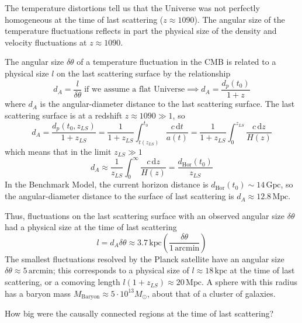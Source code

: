 \par The temperature distortions tell us that the Universe was not perfectly homogeneous at the time of last scattering ($z\approx1090$). The angular size of the temperature fluctuations reflects in part the physical size of the density and velocity fluctuations at $z \approx 1090$.
\par The angular size $\delta\theta$ of a temperature fluctuation in the CMB is related to a physical size $l$ on the last scattering surface by the relationship
\begin{equation*}
    d_{A} = \frac{l}{\delta\theta} \; \text{if we assume a flat Universe} \implies d_{A}=\frac{d_{p}(t_{0})}{1+z}
\end{equation*}
where $d_{A}$ is the angular-diameter distance to the last scattering surface. The last scattering surface is at a redshift $z\approx1090 \gg 1$, so
\begin{equation*}
    d_{A} = \frac{d_{p}(t_{0}, z_{LS})}{1+z_{LS}} = \frac{1}{1+z_{LS}}\int_{t(z_{LS})}^{t_{0}}\frac{c\,\text{d}t}{a(t)} = \frac{1}{1+z_{LS}}\int_{0}^{z_{LS}}\frac{c\,\text{d}z}{H(z)}
\end{equation*}
which means that in the limit $z_{LS}\gg 1$
\begin{equation*}
    d_{A} \approx \frac{1}{z_{LS}}\int_{0}^{\infty}\frac{c\,\text{d}z}{H(z)} = \frac{d_{\text{Hor}}(t_{0})}{z_{LS}}
\end{equation*}
In the Benchmark Model, the current horizon distance is $d_{\text{Hor}}(t_{0}) \sim 14\,\text{Gpc}$, so the angular-diameter distance to the surface of last scattering is $d_{A} \approx 12.8\,\text{Mpc}$.
\par Thus, fluctuations on the last scattering surface with an observed angular size $\delta\theta$ had a physical size at the time of last scattering
\begin{equation*}
    l = d_{A}\delta\theta \approx 3.7\,\text{kpc}\left(\frac{\delta\theta}{1\,\text{arcmin}}\right)
\end{equation*}
The smallest fluctuations resolved by the Planck satellite have an angular size $\delta\theta \approx 5\,\text{arcmin}$; this corresponds to a physical size of $l\approx 18\,\text{kpc}$ at the time of last scattering, or a comoving length $l(1+z_{LS})\approx 20\,\text{Mpc}$. A sphere with this radius has a baryon mass $M_{\text{Baryon}} \approx 5\cdot 10^{13}M_{\odot}$, about that of a cluster of galaxies.
\par How big were the causally connected regions at the time of last scattering?
